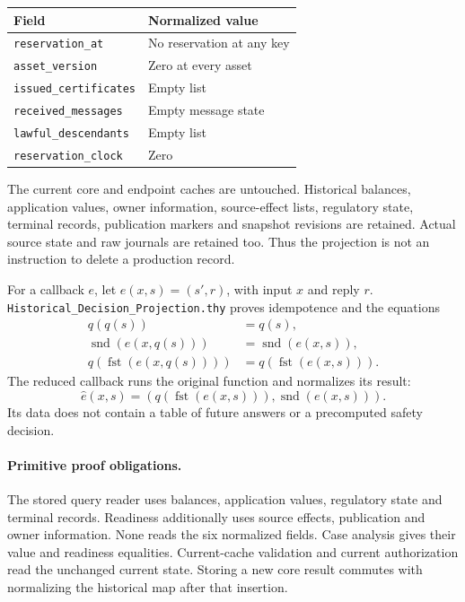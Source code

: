 \documentclass[10pt,a4paper]{article}
\newcommand{\code}[1]{\nolinkurl{#1}}
\newcommand{\source}[1]{\code{#1.thy}}
\begin{document}
\begin{center}
\begin{tabularx}{\textwidth}{@{}lY@{}}
\toprule
Field & Normalized value\\
\midrule
\code{reservation_at} & No reservation at any key\\
\code{asset_version} & Zero at every asset\\
\code{issued_certificates} & Empty list\\
\code{received_messages} & Empty message state\\
\code{lawful_descendants} & Empty list\\
\code{reservation_clock} & Zero\\
\bottomrule
\end{tabularx}
\end{center}

The current core and endpoint caches are untouched. Historical balances,
application values, owner information, source-effect lists, regulatory state,
terminal records, publication markers and snapshot revisions are retained.
Actual source state and raw journals are retained too. Thus the projection is
not an instruction to delete a production record.

For a callback $e$, let $e(x,s)=(s',r)$, with input $x$ and reply $r$.
\source{Historical_Decision_Projection} proves idempotence and the equations
\begin{align}
 q(q(s))&=q(s),\label{eq:idem}\\
 \operatorname{snd}(e(x,q(s)))&=\operatorname{snd}(e(x,s)),\label{eq:reply}\\
 q(\operatorname{fst}(e(x,q(s))))&=q(\operatorname{fst}(e(x,s))).\label{eq:update}
\end{align}
The reduced callback runs the original function and normalizes its result:
\[
\widehat e(x,s)=(q(\operatorname{fst}(e(x,s))),\operatorname{snd}(e(x,s))).
\]
Its data does not contain a table of future answers or a precomputed safety
decision.

\paragraph{Primitive proof obligations.}
The stored query reader uses balances, application values, regulatory state and
terminal records. Readiness additionally uses source effects, publication and
owner information. None reads the six normalized fields. Case analysis gives
their value and readiness equalities. Current-cache validation and current
authorization read the unchanged current state. Storing a new core result
commutes with normalizing the historical map after that insertion.
\end{document}
